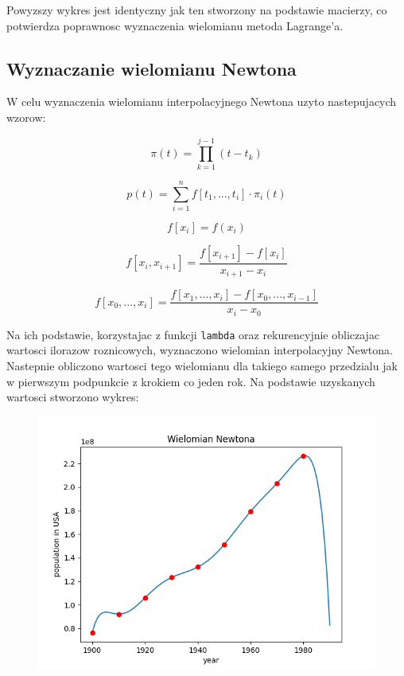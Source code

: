 \documentclass{article}
\begin{document}
	Powyzszy wykres jest identyczny jak ten stworzony na podstawie macierzy, co potwierdza poprawnosc wyznaczenia wielomianu metoda Lagrange'a.
	
	
	\subsection*{Wyznaczanie wielomianu Newtona}
	
	W celu wyznaczenia wielomianu interpolacyjnego Newtona uzyto nastepujacych wzorow:
	
	\begin{equation}
		\pi (t) = \prod _{k=1} ^ {j-1} (t-t_k)
	\end{equation}
	
	\begin{equation}
		p (t) = \sum _{i=1} ^n f[t_1,...,t_i] \cdot \pi_i(t)
	\end{equation}
	
	\begin{equation}
		f[x_i] = f(x_i)
	\end{equation}
	
	\begin{equation}
		f[x_i, x_{i+1}] = \frac{f[x_{i+1}]-f[x_{i}]}{x_{i+1} - x_{i}}
	\end{equation}
	
	\begin{equation}
		f[x_0, ..., x_i] = \frac{f[x_1, ..., x_i] - f[x_0,...,x_{i-1}]}{x_i - x_0}
	\end{equation}
	
	Na ich podstawie, korzystajac z funkcji \texttt{lambda} oraz rekurencyjnie obliczajac wartosci ilorazow roznicowych, wyznaczono wielomian interpolacyjny Newtona. Nastepnie obliczono wartosci tego wielomianu dla takiego samego przedzialu jak w pierwszym podpunkcie z krokiem co jeden rok. Na podstawie uzyskanych wartosci stworzono wykres:
	
	\newpage
	
	\begin{figure}[h]
    		\centering
  		\includegraphics[scale = 0.9]{wykres3.png}
	\end{figure}
	
\end{document}

